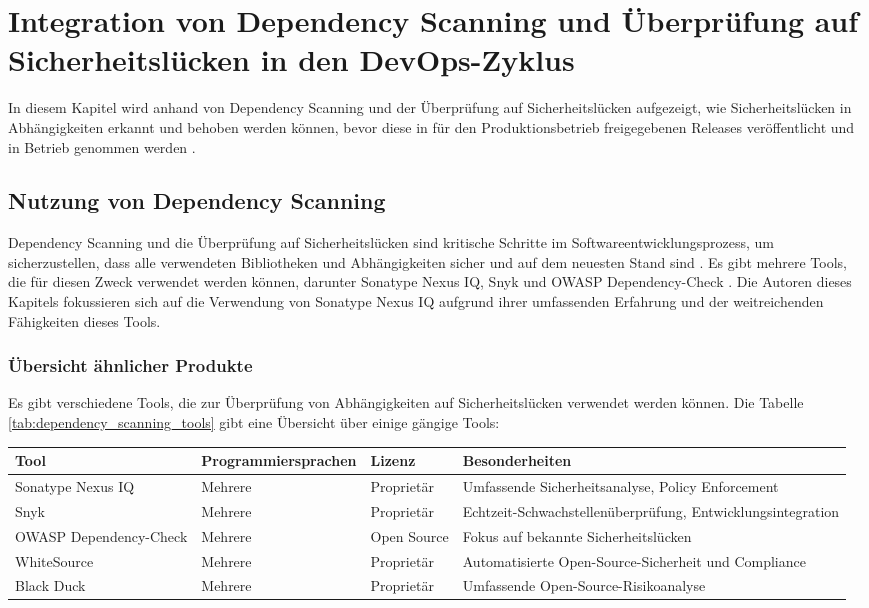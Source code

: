 \section{Integration von Dependency Scanning und Überprüfung auf Sicherheitslücken in den DevOps-Zyklus}
In diesem Kapitel wird anhand von Dependency Scanning und der Überprüfung auf Sicherheitslücken aufgezeigt, wie Sicherheitslücken in Abhängigkeiten erkannt und behoben werden können, bevor diese in für den Produktionsbetrieb freigegebenen Releases veröffentlicht und in Betrieb genommen werden \cite{Vasquez2018}.

\subsection{Nutzung von Dependency Scanning}
Dependency Scanning und die Überprüfung auf Sicherheitslücken sind kritische Schritte im Softwareentwicklungsprozess, um sicherzustellen, dass alle verwendeten Bibliotheken und Abhängigkeiten sicher und auf dem neuesten Stand sind \cite{Stevens2020}. Es gibt mehrere Tools, die für diesen Zweck verwendet werden können, darunter Sonatype Nexus IQ, Snyk und OWASP Dependency-Check \cite{OWASP2023}. Die Autoren dieses Kapitels fokussieren sich auf die Verwendung von Sonatype Nexus IQ aufgrund ihrer umfassenden Erfahrung und der weitreichenden Fähigkeiten dieses Tools.

\subsubsection{Übersicht ähnlicher Produkte}

Es gibt verschiedene Tools, die zur Überprüfung von Abhängigkeiten auf Sicherheitslücken verwendet werden können. Die Tabelle \ref{tab:dependency_scanning_tools} gibt eine Übersicht über einige gängige Tools:

\begin{table*}[h!]
\centering
\begin{tabular}{|l|l|l|l|}
\hline
\textbf{Tool} & \textbf{Programmiersprachen} & \textbf{Lizenz} & \textbf{Besonderheiten} \\ \hline
Sonatype Nexus IQ & Mehrere & Proprietär & Umfassende Sicherheitsanalyse, Policy Enforcement \\ \hline
Snyk & Mehrere & Proprietär & Echtzeit-Schwachstellenüberprüfung, Entwicklungsintegration \\ \hline
OWASP Dependency-Check & Mehrere & Open Source & Fokus auf bekannte Sicherheitslücken \\ \hline
WhiteSource & Mehrere & Proprietär & Automatisierte Open-Source-Sicherheit und Compliance \\ \hline
Black Duck & Mehrere & Proprietär & Umfassende Open-Source-Risikoanalyse \\ \hline
\end{tabular}
\caption{Übersicht von Tools zur Überprüfung von Abhängigkeiten}
\label{tab:dependency_scanning_tools}
\end{table*}

